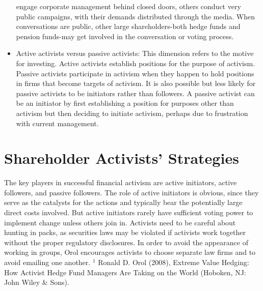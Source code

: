 \documentclass[11pt]{article}
\begin{document}
\begin{itemize}
engage corporate management behind closed doors, others conduct very public campaigns, with their demands distributed through the media. When conversations are public, other large shareholders-both hedge funds and pension funds-may get involved in the conversation or voting process.
  \item Active activists versus passive activists: This dimension refers to the motive for investing. Active activists establish positions for the purpose of activism. Passive activists participate in activism when they happen to hold positions in firms that become targets of activism. It is also possible but less likely for passive activists to be initiators rather than followers. A passive activist can be an initiator by first establishing a position for purposes other than activism but then deciding to initiate activism, perhaps due to frustration with current management.
\end{itemize}

\section*{Shareholder Activists' Strategies}
The key players in successful financial activism are active initiators, active followers, and passive followers. The role of active initiators is obvious, since they serve as the catalysts for the actions and typically bear the potentially large direct costs involved. But active initiators rarely have sufficient voting power to implement change unless others join in. Activists need to be careful about hunting in packs, as securities laws may be violated if activists work together without the proper regulatory disclosures. In order to avoid the appearance of working in groups, Orol encourages activists to choose separate law firms and to avoid emailing one another. ${ }^{1}$ Ronald D. Orol (2008), Extreme Value Hedging: How Activist Hedge Fund Managers Are Taking on the World (Hoboken, NJ: John Wiley \& Sons).
\end{document}
